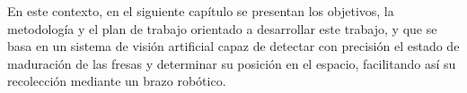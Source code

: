 En este contexto, en el siguiente capítulo se presentan los objetivos, la metodología y el plan de trabajo orientado a desarrollar este trabajo, y que se basa en un sistema de visión artificial capaz de detectar con precisión el estado de maduración de las fresas y determinar su posición en el espacio, facilitando así su recolección mediante un brazo robótico.









